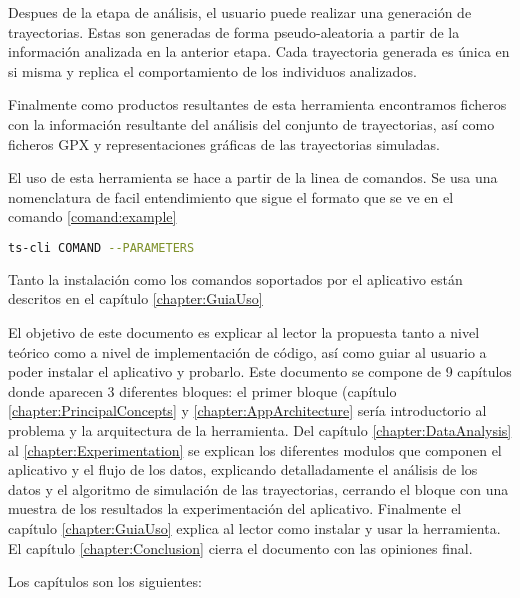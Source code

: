 Despues de la etapa de análisis, el usuario puede realizar una generación de trayectorias. Estas son generadas de forma pseudo-aleatoria a partir de la información analizada en la anterior etapa. Cada trayectoria generada es única en si misma y replica el comportamiento de los individuos analizados.

Finalmente como productos resultantes de esta herramienta encontramos ficheros con la información resultante del análisis del conjunto de trayectorias, así como ficheros \ac{GPX} y representaciones gráficas de las trayectorias simuladas.

El uso de esta herramienta se hace a partir de la linea de comandos. Se usa una nomenclatura de facil entendimiento que sigue el formato que se ve en el comando \ref{comand:example}

\begin{lstlisting}[caption={Ejecución simulación}, language=bash, label={comand:example}]  
	ts-cli COMAND --PARAMETERS
\end{lstlisting}

Tanto la instalación como los comandos soportados por el aplicativo están descritos en el capítulo \ref{chapter:GuiaUso}

El objetivo de este documento es explicar al lector la propuesta tanto a nivel teórico como a nivel de implementación de código, así como guiar al usuario a poder instalar el aplicativo y probarlo. Este documento se compone de 9 capítulos donde aparecen 3 diferentes bloques: el primer bloque  (capítulo \ref{chapter:PrincipalConcepts} y \ref{chapter:AppArchitecture}   sería introductorio al problema y la arquitectura de la herramienta. Del capítulo \ref{chapter:DataAnalysis} al \ref{chapter:Experimentation} se explican los diferentes modulos que componen el aplicativo y el flujo de los datos, explicando detalladamente el análisis de los datos y el algoritmo de simulación de las trayectorias, cerrando el bloque con una muestra de los resultados la experimentación del aplicativo. Finalmente el capítulo \ref{chapter:GuiaUso} explica al lector como instalar y usar la herramienta. El capítulo \ref{chapter:Conclusion} cierra el documento con las opiniones final.

Los capítulos son los siguientes:

